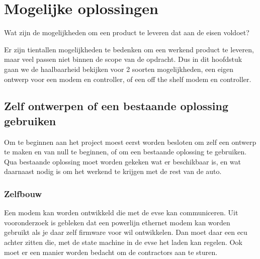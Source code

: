\chapter{Mogelijke oplossingen}
\label{Mogelijke_oplossingen}

\begin{center}
    \begin{minipage}{0.5\textwidth}
        \begin{small}
            Wat zijn de mogelijkheden om een product te leveren dat aan de
            eisen voldoet?
        \end{small} 
    \end{minipage}
    \vspace{0.5cm}
\end{center}

Er zijn tientallen  mogelijkheden te bedenken om een werkend product te
leveren, maar veel passen niet binnen de scope van de opdracht. Dus in dit
hoofdstuk gaan we de haalbaarheid bekijken voor 2 soorten mogelijkheden, een
eigen ontwerp voor een modem en controller, of een off the shelf modem en
controller.

\section{Zelf ontwerpen of een bestaande oplossing gebruiken}

Om te beginnen aan het project moest eerst worden besloten om zelf een ontwerp
te maken en van null te beginnen, of om een bestaande oplossing te gebruiken.
Qua bestaande oplossing moet worden gekeken wat er beschikbaar is, en wat
daarnaast nodig is om het werkend te krijgen met de rest van de auto.

\subsection{Zelfbouw}

Een modem kan worden ontwikkeld die met de \ac{evse} kan communiceren. Uit
vooronderzoek is gebleken dat een powerlijn ethernet modem kan worden gebruikt
als je daar zelf firmware voor wil ontwikkelen. Dan moet daar een \ac{ecu}
achter zitten die, met de state machine in de \ac{evse} het laden kan regelen.
Ook moet er een manier worden bedacht om de contractors aan te sturen.

